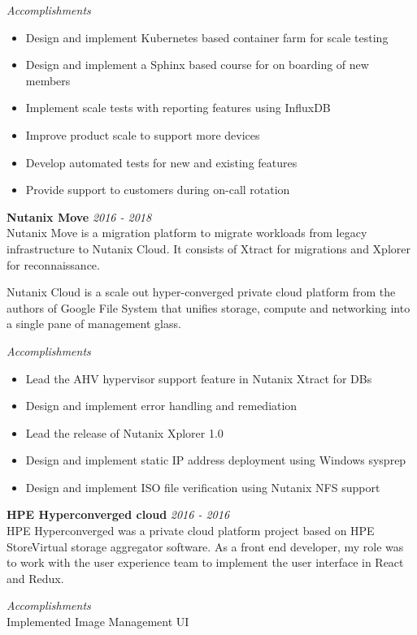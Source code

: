 \documentclass[line,margin]{res}
\begin{document}
\begin{resume}
{\it{Accomplishments}}\\
\begin{itemize}
\item Design and implement Kubernetes based container farm for scale testing
\item Design and implement a Sphinx based course for on boarding of new members 
\item Implement scale tests with reporting features using InfluxDB
\item Improve product scale to support more devices
\item Develop automated tests for new and existing features
\item Provide support to customers during on-call rotation
\end{itemize}
{\bf Nutanix Move} \hfill {\it{2016 - 2018}}\\

Nutanix Move is a migration platform to migrate workloads from legacy infrastructure to Nutanix Cloud. It consists of Xtract for migrations and Xplorer for reconnaissance.

Nutanix Cloud is a scale out hyper-converged private cloud platform from the authors of Google File System that unifies storage, compute and networking into a single pane of management glass. 

{\it{Accomplishments}}\\
\begin{itemize}
\item Lead the AHV hypervisor support feature in Nutanix Xtract for DBs
\item Design and implement error handling and remediation
\item Lead the release of Nutanix Xplorer 1.0
\item Design and implement static IP address deployment using Windows sysprep
\item Design and implement ISO file verification using Nutanix NFS support
\end{itemize}

{\bf HPE Hyperconverged cloud} \hfill {\it{2016 - 2016}}\\

HPE Hyperconverged was a private cloud platform project based on HPE StoreVirtual storage aggregator software. As a front end developer, my role was to work with the user experience team to implement the user interface in React and Redux.

{\it{Accomplishments}}\\
Implemented Image Management UI\\


\end{resume}
\end{document}
